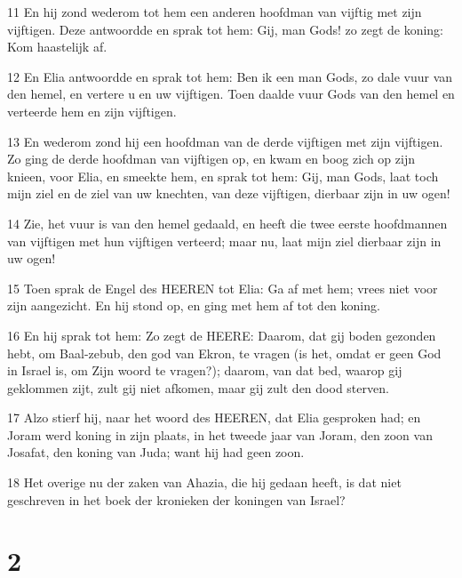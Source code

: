 \par 11 En hij zond wederom tot hem een anderen hoofdman van vijftig met zijn vijftigen. Deze antwoordde en sprak tot hem: Gij, man Gods! zo zegt de koning: Kom haastelijk af.
\par 12 En Elia antwoordde en sprak tot hem: Ben ik een man Gods, zo dale vuur van den hemel, en vertere u en uw vijftigen. Toen daalde vuur Gods van den hemel en verteerde hem en zijn vijftigen.
\par 13 En wederom zond hij een hoofdman van de derde vijftigen met zijn vijftigen. Zo ging de derde hoofdman van vijftigen op, en kwam en boog zich op zijn knieen, voor Elia, en smeekte hem, en sprak tot hem: Gij, man Gods, laat toch mijn ziel en de ziel van uw knechten, van deze vijftigen, dierbaar zijn in uw ogen!
\par 14 Zie, het vuur is van den hemel gedaald, en heeft die twee eerste hoofdmannen van vijftigen met hun vijftigen verteerd; maar nu, laat mijn ziel dierbaar zijn in uw ogen!
\par 15 Toen sprak de Engel des HEEREN tot Elia: Ga af met hem; vrees niet voor zijn aangezicht. En hij stond op, en ging met hem af tot den koning.
\par 16 En hij sprak tot hem: Zo zegt de HEERE: Daarom, dat gij boden gezonden hebt, om Baal-zebub, den god van Ekron, te vragen (is het, omdat er geen God in Israel is, om Zijn woord te vragen?); daarom, van dat bed, waarop gij geklommen zijt, zult gij niet afkomen, maar gij zult den dood sterven.
\par 17 Alzo stierf hij, naar het woord des HEEREN, dat Elia gesproken had; en Joram werd koning in zijn plaats, in het tweede jaar van Joram, den zoon van Josafat, den koning van Juda; want hij had geen zoon.
\par 18 Het overige nu der zaken van Ahazia, die hij gedaan heeft, is dat niet geschreven in het boek der kronieken der koningen van Israel?

\chapter{2}

